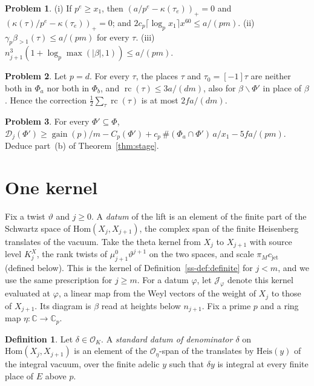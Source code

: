 \documentclass[reqno]{amsart}
\theoremstyle{plain}
\theoremstyle{definition}
\newtheorem{problem}{Problem}[section]
\newtheorem{definition}[theorem]{Definition}
\theoremstyle{remark}
\newcommand{\C}{{\mathbb{C}}}
\newcommand{\Oc}{\mathcal O}
\newcommand{\Dc}{\mathcal D}
\newcommand{\Jc}{\mathcal J}
\newcommand{\gain}{\operatorname{gain}}
\newcommand{\Heis}{\mathrm{Heis}}
\newcommand{\cjet}{c_{\mathrm{jet}}}
\newcommand{\bl}{\beta_{>1}}
\begin{document}
\begin{problem}\label{pr:errors}
(i) If \(p^e \ge x_1\), then \((a/p^e - \kappa(\tau_e))_+ = 0\) and \((\kappa(\tau)/p^e - \kappa(\tau_e))_+ = 0\); and \(2c_p \lceil \log_p x_1 \rceil x^{60} \le a/(pm)\).  (ii) \(\gamma_p \bl(\tau) \le a/(pm)\) for every \(\tau\).  (iii) \(n_{j+1}^3 (1 + \log_p \max(\lvert\beta\rvert, 1)) \le a/(pm)\).
\end{problem}

\begin{problem}\label{pr:ramified-correction}
Let \(p = d\).  For every \(\tau\), the places \(\tau\) and \(\tau_0 = [-1]\tau\) are neither both in \(\Phi_a\) nor both in \(\Phi_b\), and \(\operatorname{rc}(\tau) \le 3a/(dm)\), also for \(\beta \smallsetminus \Phi'\) in place of \(\beta\).  Hence the correction \(\frac12 \sum_\tau \operatorname{rc}(\tau)\) is at most \(2fa/(dm)\).
\end{problem}

\begin{problem}\label{pr:assemble}
For every \(\Phi' \subseteq \Phi\), \(\Dc_j(\Phi') \ge \gain(p)/m - C_p(\Phi') + c_p\, \#(\Phi_a \cap \Phi')\, a/x_1 - 5fa/(pm)\).  Deduce part~(b) of Theorem~\ref{thm:stage}.
\end{problem}

\section{One kernel}\label{sec:kernel}

Fix a twist \(\vartheta\) and \(j \ge 0\).  A \emph{datum} of the lift is an element of the finite part of the Schwartz space of \(\mathrm{Hom}(X_j, X_{j+1})\), the complex span of the finite Heisenberg translates of the vacuum.  Take the theta kernel from \(X_j\) to \(X_{j+1}\) with source level \(K^X_j\), the rank twists of \(\mu_{j+1}^0\vartheta^{j+1}\) on the two spaces, and scale \(\pi_M\cjet\) (defined below).  This is the kernel of Definition~\ref{ss-def:definite} for \(j < m\), and we use the same prescription for \(j \ge m\).  For a datum \(\varphi\), let \(\Jc_\varphi\) denote this kernel evaluated at \(\varphi\), a linear map from the Weyl vectors of the weight of \(X_j\) to those of \(X_{j+1}\).  Its diagram is \(\beta\) read at heights below \(n_{j+1}\).  Fix a prime \(p\) and a ring map \(\eta\colon \C \to \C_p\).

\begin{definition}\label{def:standard}
Let \(\delta \in \Oc_K\).  A \emph{standard datum of denominator \(\delta\)} on \(\mathrm{Hom}(X_j, X_{j+1})\) is an element of the \(\Oc_\eta\)-span of the translates by \(\Heis(y)\) of the integral vacuum, over the finite adelic \(y\) such that \(\delta y\) is integral at every finite place of \(E\) above \(p\).
\end{definition}
\end{document}

